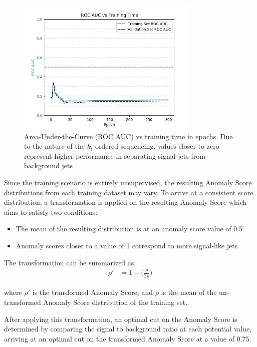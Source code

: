 \documentclass[12pt, a4paper]{article}
\begin{document}
\begin{figure}[H]
	\begin{center}
		\includegraphics[width=250pt]{imgs/auc_vs_epoch.png}
	\end{center}
	\caption{Area-Under-the-Curve (ROC AUC) vs training time in epochs. Due to the nature of the $k_{t}$-ordered sequencing, values closer to zero represent higher performance in separating signal jets from background jets}
	\label{fig:auc_vs_epoch}
\end{figure}

Since the training scenario is entirely unsupervised, the resulting Anomaly Score distributions from each training dataset may vary. To arrive at a consistent score distribution, a transformation is applied on the resulting Anomaly Score which aims to satisfy two conditions:
\begin{itemize}
	\item{The mean of the resulting distribution is at an anomaly score value of 0.5}
	\item{Anomaly scores closer to a value of 1 correspond to more signal-like jets}
\end{itemize}

The transformation can be summarized as
\begin{align*}
\rho ' &= 1 - \bigg(\frac{\rho}{2\overline{\rho}}\bigg)
\end{align*}

where $\rho '$ is the transformed Anomaly Score, and  $\overline{\rho}$ is the mean of the un-transformed Anomaly Score distribution of the training set. 

After applying this transformation, an optimal cut on the Anomaly Score is determined by comparing the signal to background ratio at each potential value, arriving at an optimal cut on the transformed Anomaly Score at a value of 0.75.
\end{document}
